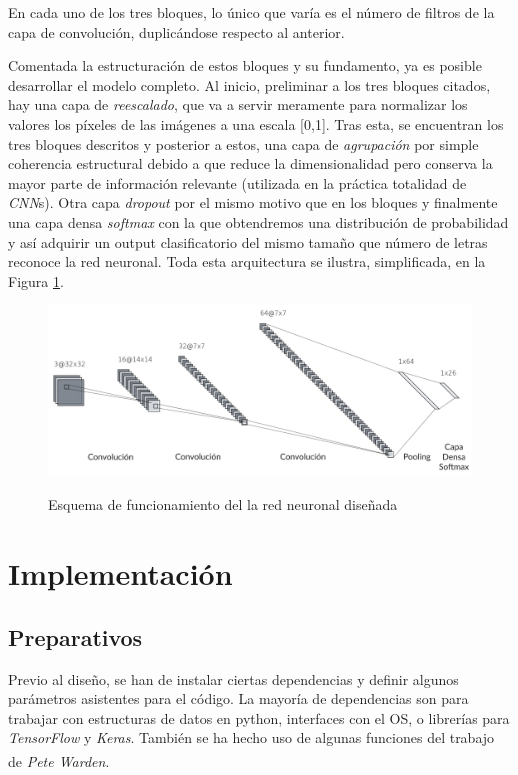 En cada uno de los tres bloques, lo único que varía es el número de filtros de
la capa de convolución, duplicándose respecto al anterior.

Comentada la estructuración de estos bloques y su fundamento, ya es posible
desarrollar el modelo completo.
Al inicio, preliminar a los tres bloques citados, hay una capa de \textit{reescalado},
que va a servir meramente para normalizar los valores los píxeles de las imágenes
a una escala [0,1].
Tras esta, se encuentran los tres bloques descritos y posterior a estos,
una capa de \textit{agrupación} por simple
coherencia estructural debido a que reduce la dimensionalidad pero conserva la mayor
parte de información relevante (utilizada en la práctica totalidad de \textit{CNN}s).
Otra capa \textit{dropout} por el mismo motivo que en los
bloques y finalmente una capa densa \textit{softmax} con la que obtendremos una distribución
de probabilidad y así adquirir un output clasificatorio del mismo tamaño que número de letras
reconoce la red neuronal. Toda esta arquitectura se ilustra, simplificada, en la Figura \ref{esqRN}.

\begin{figure}[h]
    \centering
    \includegraphics[width=1\textwidth]{capturas/esquemaRN.png}\\[-0,40cm]
    \caption{Esquema de funcionamiento del la red neuronal diseñada \label{esqRN}}
\end{figure}

\section{Implementación}
\subsection{Preparativos}
Previo al diseño, se han de instalar ciertas dependencias y definir
algunos parámetros asistentes para el código. La mayoría de dependencias
son para trabajar con estructuras de datos en python, interfaces con el OS, o
librerías para \textit{TensorFlow} y \textit{Keras}.
También se ha hecho uso de algunas funciones del trabajo de
\textit{Pete Warden}\textsuperscript{\cite{petewardenmw}}.

